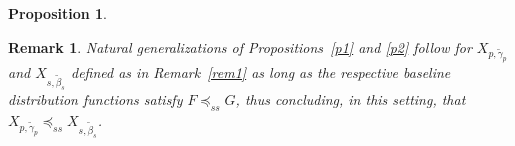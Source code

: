 \documentclass [11pt]{article}
\newtheorem{remark}{Remark}
\newtheorem{proposition}{Proposition}
\begin{document}
\begin{proposition}
%
%    
\end{proposition}

\begin{remark}\label{rem3}
Natural generalizations of Propositions~\ref{p1} and \ref{p2} follow for $X_{p,\tilde{\gamma}_p}$ and $X_{s, \tilde{\beta}_s}$ defined as in 
Remark~\ref{rem1} as long as the respective baseline distribution functions satisfy $F \preceq_{ss} G$, thus concluding, in this setting, that $X_{p,\tilde{\gamma}_p} \preceq_{ss}X_{s, \tilde{\beta}_s}$.
\end{remark}
\end{document}
